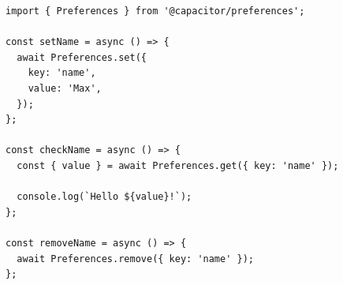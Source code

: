 \begin{lstlisting}[language=HTML, caption=Contoh Kode Plugin Preference, label=kode:preference-capacitor-example]
import { Preferences } from '@capacitor/preferences';

const setName = async () => {
  await Preferences.set({
    key: 'name',
    value: 'Max',
  });
};

const checkName = async () => {
  const { value } = await Preferences.get({ key: 'name' });

  console.log(`Hello ${value}!`);
};

const removeName = async () => {
  await Preferences.remove({ key: 'name' });
};
\end{lstlisting}





		
			

